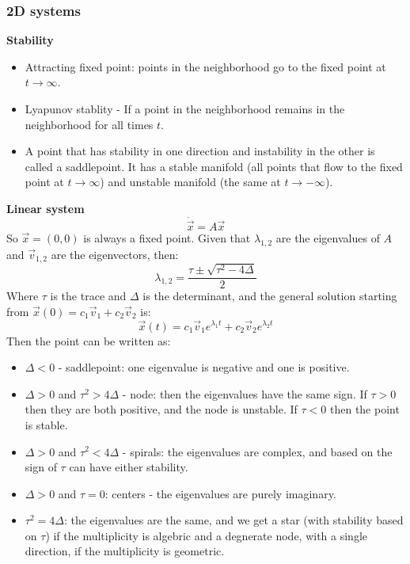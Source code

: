 \documentclass[twocolumn]{article}
\begin{document}
\subsubsection{2D systems}
\textbf{Stability}
\begin{itemize}
    \item Attracting fixed point: points in the neighborhood go to the fixed point at $t\rightarrow\infty$.
    \item Lyapunov stablity - If a point in the neighborhood remains in the neighborhood for all times $t$.
    \item A point that has stability in one direction and instability in the other is called a saddlepoint. It has a stable manifold (all points that flow to the fixed point at $t\rightarrow\infty$) and unstable manifold (the same at $t\rightarrow-\infty$). 
\end{itemize}
\textbf{Linear system}
\begin{equation}
    \dot{\vec{x}} = A\vec{x}
\end{equation}
So $\vec{x} = (0,0)$ is always a fixed point.
Given that $\lambda_{1,2}$ are the eigenvalues of $A$ and $\vec{v}_{1,2}$ are the eigenvectors, then:
\begin{equation}
    \lambda_{1,2} = \frac{\tau \pm \sqrt{\tau^2 -4\Delta}}{2}
\end{equation}
Where $\tau$ is the trace and $\Delta$ is the determinant, and the general solution starting from $\vec{x}(0) = c_1\vec{v}_1 + c_2\vec{v}_2$ is:
\begin{equation}
    \vec{x}(t) = c_1 \vec{v}_1 e^{\lambda_1 t} + c_2 \vec{v}_2 e^{\lambda_2 t}
\end{equation}
Then the point can be written as:
\begin{itemize}
    \item $\Delta < 0$ - saddlepoint: one eigenvalue is negative and one is positive.
    \item $\Delta > 0$ and $\tau^2 > 4\Delta$ - node: then the eigenvalues have the same sign. If $\tau > 0$ then they are both positive, and the node is unstable. If $\tau < 0$ then the point is stable.
    \item $\Delta > 0$ and $\tau^2 < 4\Delta$ - spirals: the eigenvalues are complex, and based on the sign of $\tau$ can have either stability.
    \item $\Delta > 0$ and $\tau = 0$: centers - the eigenvalues are purely imaginary.
    \item $\tau^2 = 4\Delta$: the eigenvalues are the same, and we get a star (with stability based on $\tau$) if the multiplicity is algebric and a degnerate node, with a single direction, if the multiplicity is geometric.
\end{itemize}
\end{document}
